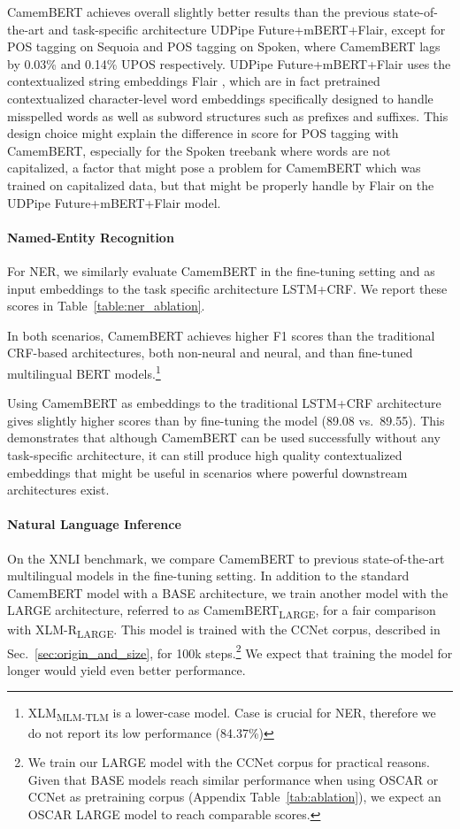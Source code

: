 \documentclass[11pt,a4paper]{article}
\newcommand{\camembert}{CamemBERT\xspace}
\newcommand{\camembertccnetlarge}{CamemBERT\textsubscript{LARGE}\xspace}
\newcommand{\mbert}{mBERT\xspace}
\newcommand{\ccnet}{CCNet\xspace}
\newcommand{\oscar}{OSCAR\xspace}
\newcommand{\xlmmlmtlm}{XLM\textsubscript{MLM-TLM}\xspace}
\begin{document}
\camembert achieves overall slightly better results than the previous state-of-the-art and task-specific architecture UDPipe Future+\mbert+Flair, except for POS tagging on Sequoia and POS tagging on Spoken, where \camembert lags by 0.03\% and 0.14\% UPOS respectively.
UDPipe Future+\mbert+Flair uses the contextualized string embeddings Flair \citep{akbik2018contextual}, which are in fact pretrained contextualized character-level word embeddings specifically designed to handle misspelled words as well as subword structures such as prefixes and suffixes. This design choice might explain the difference in score for POS tagging with CamemBERT, especially for the Spoken treebank where words are not capitalized, a factor that might pose a problem for CamemBERT which was trained on capitalized data, but that might be properly handle by Flair on the UDPipe Future+\mbert+Flair model.

\paragraph{Named-Entity Recognition}
For NER, we similarly evaluate \camembert in the fine-tuning setting and as input embeddings to the task specific architecture LSTM+CRF. We report these scores in Table~\ref{table:ner_ablation}.

In both scenarios, \camembert achieves higher F1 scores than the traditional CRF-based architectures, both non-neural and neural, and than fine-tuned multilingual BERT models.\footnote{\xlmmlmtlm is a lower-case model. Case is crucial for NER, therefore we do not report its low performance (84.37\%)}

Using \camembert as embeddings to the traditional LSTM+CRF architecture gives slightly higher scores than by fine-tuning the model (89.08 vs.~89.55).
This demonstrates that although \camembert can be used successfully without any task-specific architecture, it can still produce high quality contextualized embeddings that might be useful in scenarios where powerful downstream architectures exist.




\paragraph{Natural Language Inference}
On the XNLI benchmark, we compare \camembert to previous state-of-the-art multilingual models in the fine-tuning setting. In addition to the standard \camembert model with a BASE architecture, we train another model with the LARGE architecture, referred to as \camembertccnetlarge, for a fair comparison with XLM-R\textsubscript{LARGE}.
This model is trained with the \ccnet corpus, described in Sec.~\ref{sec:origin_and_size}, for 100k steps.\footnote{We train our LARGE model with the \ccnet corpus for practical reasons. Given that BASE models reach similar performance when using \oscar or \ccnet as pretraining corpus (Appendix Table~\ref{tab:ablation}), we expect an \oscar LARGE model to reach comparable scores.} We expect that training the model for longer would yield even better performance.
\end{document}
